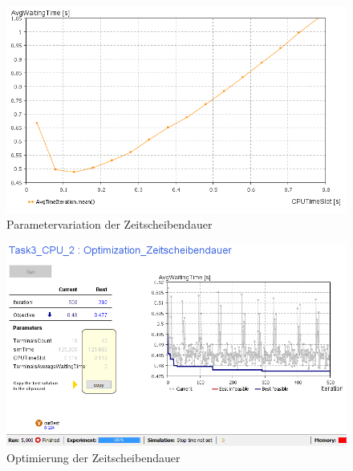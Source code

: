 \documentclass[
a4paper,   
headsepline, 
fleqn,     
11pt
]{scrartcl}
\begin{document}
\begin{figure}[h]
  \centering
  \includegraphics[width=1\textwidth]{./images/ParameterVariationCPUTimeSlot_1}
  \caption{Parametervariation der Zeitscheibendauer}
  \label{fig:ParametervariationB-02}
\end{figure}

\begin{figure}[h]
  \centering
  \includegraphics[width=1\textwidth]{./images/Optimization}
  \caption{Optimierung der Zeitscheibendauer}
  \label{fig:OptimizationC}
\end{figure}

\appendix  


\end{document}
